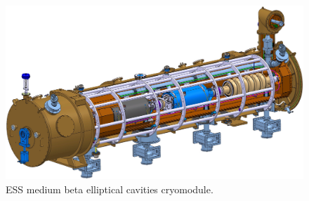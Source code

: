 \begin{figure}[!ht]
	\begin{center}
		\includegraphics[width=\textwidth]{02_BeamDiag/figures/fig000_cryo_a2}
	\end{center}
	\caption[ESS medium beta elliptical cavities cryomodule]{ESS medium beta elliptical cavities cryomodule.}
	\label{chap2:fig:ESS_cryo}
\end{figure}
